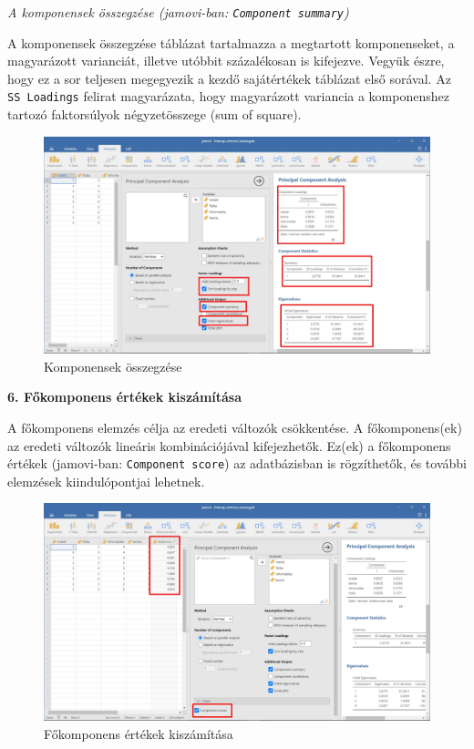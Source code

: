 \documentclass[
  letterpaper,
]{krantz}
\begin{document}
\emph{A komponensek összegzése (jamovi-ban:
\texttt{Component\ summary})}

A komponensek összegzése táblázat tartalmazza a megtartott
komponenseket, a magyarázott varianciát, illetve utóbbit százalékosan is
kifejezve. Vegyük észre, hogy ez a sor teljesen megegyezik a kezdő
sajátértékek táblázat első sorával. Az \texttt{SS\ Loadings} felirat
magyarázata, hogy magyarázott variancia a komponenshez tartozó
faktorsúlyok négyzetösszege (sum of square).

\begin{figure}

{\centering \includegraphics{./images/fokomponens_kep_04.jpg}

}

\caption{Komponensek összegzése}

\end{figure}

\textbf{6. Főkomponens értékek kiszámítása}

A főkomponens elemzés célja az eredeti változók csökkentése. A
főkomponens(ek) az eredeti változók lineáris kombinációjával
kifejezhetők. Ez(ek) a főkomponens értékek (jamovi-ban:
\texttt{Component\ score}) az adatbázisban is rögzíthetők, és további
elemzések kiindulópontjai lehetnek.

\begin{figure}

{\centering \includegraphics{./images/fokomponens_kep_05.jpg}

}

\caption{Főkomponens értékek kiszámítása}

\end{figure}
\end{document}
